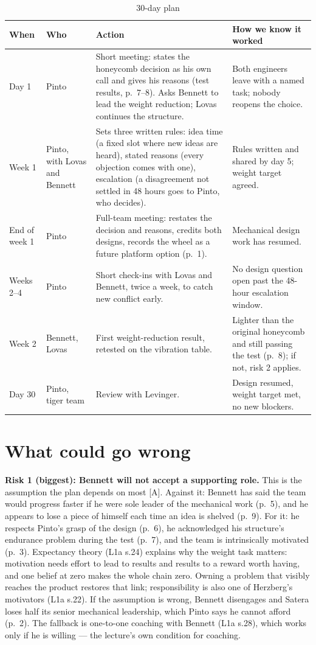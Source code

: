 \documentclass[oneside,final,11pt,letterpaper]{article}
\begin{document}
\begin{table}[H]
\centering
\small
\caption{30-day plan}
\label{tab:plan}
\begin{tabularx}{\textwidth}{l L{2.3cm} X X}
\toprule
\textbf{When} & \textbf{Who} & \textbf{Action} & \textbf{How we know it worked} \\
\midrule
Day 1 & Pinto & Short meeting: states the honeycomb decision as his own call and gives his reasons (test results, p.~7--8). Asks Bennett to lead the weight reduction; Lovas continues the structure. & Both engineers leave with a named task; nobody reopens the choice. \\
Week 1 & Pinto, with Lovas and Bennett & Sets three written rules: idea time (a fixed slot where new ideas are heard), stated reasons (every objection comes with one), escalation (a disagreement not settled in 48 hours goes to Pinto, who decides). & Rules written and shared by day 5; weight target agreed. \\
End of week 1 & Pinto & Full-team meeting: restates the decision and reasons, credits both designs, records the wheel as a future platform option (p.~1). & Mechanical design work has resumed. \\
Weeks 2--4 & Pinto & Short check-ins with Lovas and Bennett, twice a week, to catch new conflict early. & No design question open past the 48-hour escalation window. \\
Week 2 & Bennett, Lovas & First weight-reduction result, retested on the vibration table. & Lighter than the original honeycomb and still passing the test (p.~8); if not, risk 2 applies. \\
Day 30 & Pinto, tiger team & Review with Levinger. & Design resumed, weight target met, no new blockers. \\
\bottomrule
\end{tabularx}
\end{table}

\section{What could go wrong}
\textbf{Risk 1 (biggest): Bennett will not accept a supporting role.}
This is the assumption the plan depends on most [A]. Against it: Bennett has said the team would progress faster if he were sole leader of the mechanical work (p.~5), and he appears to lose a piece of himself each time an idea is shelved (p.~9). For it: he respects Pinto's grasp of the design (p.~6), he acknowledged his structure's endurance problem during the test (p.~7), and the team is intrinsically motivated (p.~3). Expectancy theory (L1a s.24) explains why the weight task matters: motivation needs effort to lead to results and results to a reward worth having, and one belief at zero makes the whole chain zero. Owning a problem that visibly reaches the product restores that link; responsibility is also one of Herzberg's motivators (L1a s.22). If the assumption is wrong, Bennett disengages and Satera loses half its senior mechanical leadership, which Pinto says he cannot afford (p.~2). The fallback is one-to-one coaching with Bennett (L1a s.28), which works only if he is willing --- the lecture's own condition for coaching.
\end{document}
